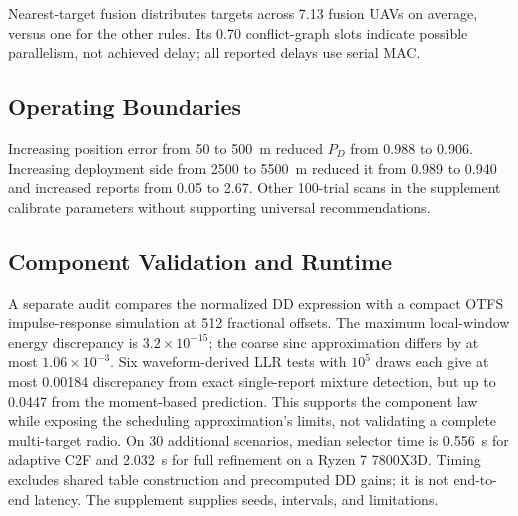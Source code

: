 Nearest-target fusion distributes targets across 7.13 fusion UAVs on average,
versus one for the other rules. Its 0.70 conflict-graph slots indicate possible
parallelism, not achieved delay; all reported delays use serial MAC.

\subsection{Operating Boundaries}

Increasing position error from 50 to 500~m reduced $P_D$ from 0.988 to
0.906. Increasing deployment side from 2500 to 5500~m reduced it from 0.989
to 0.940 and increased reports from 0.05 to 2.67. Other 100-trial scans in
the supplement calibrate parameters without supporting universal recommendations.

\subsection{Component Validation and Runtime}

A separate audit compares the normalized DD expression with a compact OTFS
impulse-response simulation at 512 fractional offsets. The maximum local-window
energy discrepancy is $3.2\times10^{-15}$; the coarse sinc approximation differs
by at most $1.06\times10^{-3}$. Six waveform-derived LLR tests with $10^5$ draws
each give at most 0.00184 discrepancy from exact single-report mixture detection,
but up to 0.0447 from the moment-based prediction. This supports the component
law while exposing the scheduling approximation's limits, not validating a
complete multi-target radio. On 30 additional scenarios, median selector time
is 0.556~s for adaptive C2F and 2.032~s for full refinement on a Ryzen 7 7800X3D.
Timing excludes shared table construction and precomputed DD gains; it is not
end-to-end latency. The supplement supplies seeds, intervals, and limitations.
